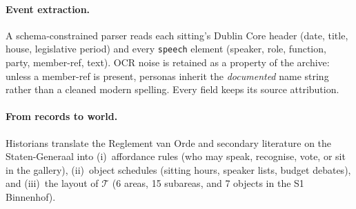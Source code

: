 \documentclass[sigconf,review,anonymous]{acmart}
\begin{document}
\paragraph{Event extraction.} A schema-constrained parser reads each
sitting's Dublin Core header (date, title, house, legislative period) and
every \texttt{speech} element (speaker, role, function, party, member-ref,
text). OCR noise is retained as a property of the archive: unless a
member-ref is present, personas inherit the \emph{documented} name string
rather than a cleaned modern spelling. Every field keeps its source
attribution.

\paragraph{From records to world.} Historians translate the Reglement van
Orde and secondary literature on the Staten-Generaal into
(i)~affordance rules (who may speak, recognise, vote, or sit in the
gallery), (ii)~object schedules (sitting hours, speaker lists, budget
debates), and (iii)~the layout of $\mathcal{T}$ (6 areas, 15 subareas, and
7 objects in the S1 Binnenhof).
\end{document}
